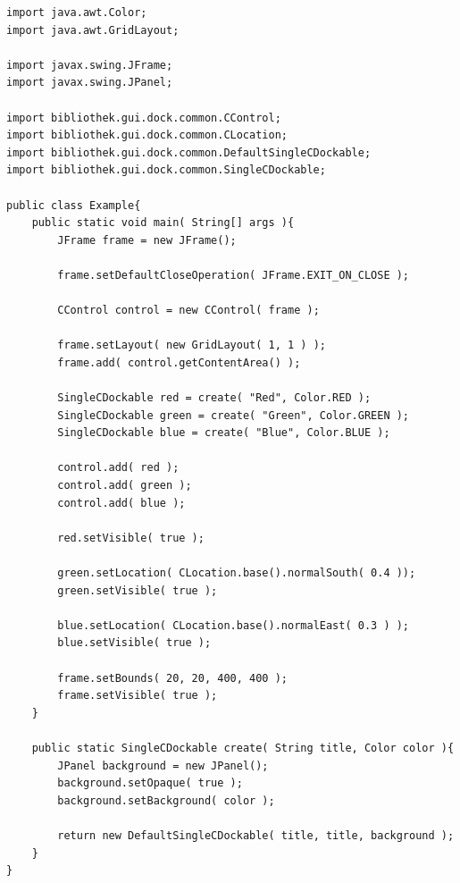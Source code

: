 \begin{lstlisting}
import java.awt.Color;
import java.awt.GridLayout;

import javax.swing.JFrame;
import javax.swing.JPanel;

import bibliothek.gui.dock.common.CControl;
import bibliothek.gui.dock.common.CLocation;
import bibliothek.gui.dock.common.DefaultSingleCDockable;
import bibliothek.gui.dock.common.SingleCDockable;

public class Example{
	public static void main( String[] args ){
		JFrame frame = new JFrame();
		
		frame.setDefaultCloseOperation( JFrame.EXIT_ON_CLOSE );
		
		CControl control = new CControl( frame );
		
		frame.setLayout( new GridLayout( 1, 1 ) );
		frame.add( control.getContentArea() );
		
		SingleCDockable red = create( "Red", Color.RED );
		SingleCDockable green = create( "Green", Color.GREEN );
		SingleCDockable blue = create( "Blue", Color.BLUE );
		
		control.add( red );
		control.add( green );
		control.add( blue );
		
		red.setVisible( true );
		
		green.setLocation( CLocation.base().normalSouth( 0.4 ));
		green.setVisible( true );
		
		blue.setLocation( CLocation.base().normalEast( 0.3 ) );
		blue.setVisible( true );
		
		frame.setBounds( 20, 20, 400, 400 );
		frame.setVisible( true );
	}
	
	public static SingleCDockable create( String title, Color color ){
		JPanel background = new JPanel();
		background.setOpaque( true );
		background.setBackground( color );
		
		return new DefaultSingleCDockable( title, title, background );
	}
}

\end{lstlisting} 
